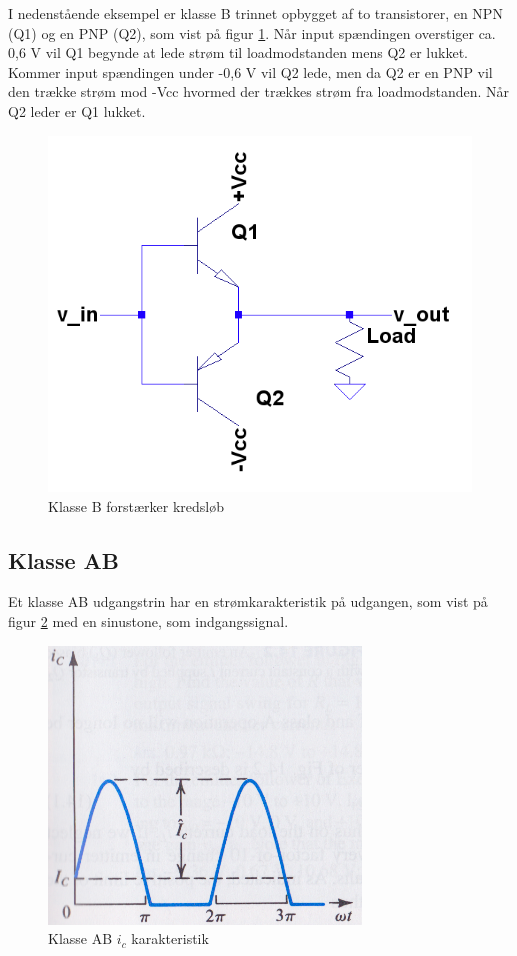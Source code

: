 I nedenstående eksempel er klasse B trinnet opbygget af to transistorer, en NPN (Q1) og en PNP (Q2), som vist på figur \ref{fig:classb}. Når input spændingen overstiger ca. 0,6 V vil Q1 begynde at lede strøm til loadmodstanden mens Q2 er lukket. Kommer input spændingen under -0,6 V vil Q2 lede, men da Q2 er en PNP vil den trække strøm mod -Vcc hvormed der trækkes strøm fra loadmodstanden. Når Q2 leder er Q1 lukket. 

\begin{figure}[h]
\centering
\includegraphics[scale=.35]{indledende_analyse/klasser/classb.png}
\caption{Klasse B forstærker kredsløb}
\label{fig:classb}
\end{figure}

\subsection{Klasse AB}

Et klasse AB udgangstrin har en strømkarakteristik på udgangen, som vist på figur \ref{fig:klasseab} med en sinustone, som indgangssignal. 

\begin{figure}[h]
\centering
\includegraphics[scale=.35]{indledende_analyse/klasser/klasseab.png}
\caption{Klasse AB $i_c$ karakteristik}
\label{fig:klasseab}
\end{figure}

